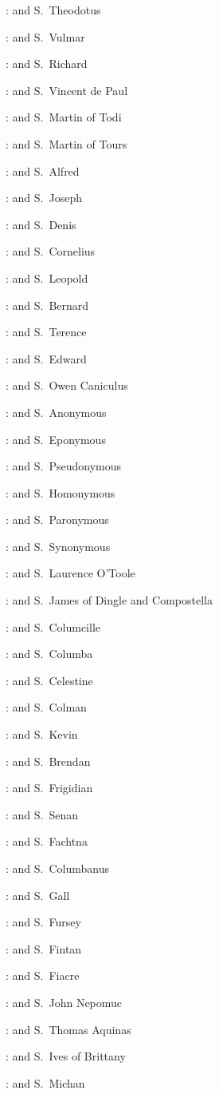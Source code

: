 :
and S.~Theodotus

:
and S.~Vulmar

:
and S.~Richard

:
and S.~Vincent de Paul

:
and S.~Martin of Todi

:
and S.~Martin of Tours

:
and S.~Alfred

:
and S.~Joseph

:
and S.~Denis

:
and S.~Cornelius

:
and S.~Leopold

:
and S.~Bernard

:
and S.~Terence

:
and S.~Edward

:
and S.~Owen Caniculus

:
and S.~Anonymous

:
and S.~Eponymous

:
and S.~Pseudonymous

:
and S.~Homonymous

:
and S.~Paronymous

:
and S.~Synonymous

:
and S.~Laurence O'Toole

:
and S.~James of Dingle and Compostella

:
and S.~Columcille

:
and S.~Columba

:
and S.~Celestine

:
and S.~Colman

:
and S.~Kevin

:
and S.~Brendan

:
and S.~Frigidian

:
and S.~Senan

:
and S.~Fachtna

:
and S.~Columbanus

:
and S.~Gall

:
and S.~Fursey

:
and S.~Fintan

:
and S.~Fiacre

:
and S.~John Nepomuc

:
and S.~Thomas Aquinas

:
and S.~Ives of Brittany

:
and S.~Michan

